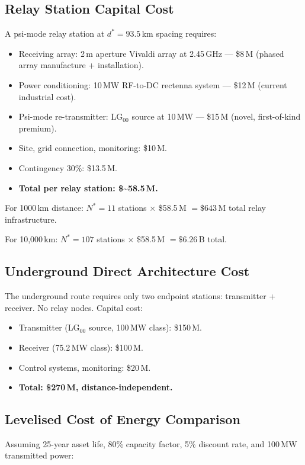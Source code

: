 \documentclass[aps,prd,twocolumn,superscriptaddress]{revtex4-2}
\begin{document}
\subsection{Relay Station Capital Cost}

A psi-mode relay station at $d^* = 93.5$\,km spacing requires:
\begin{itemize}
\item Receiving array: 2\,m aperture Vivaldi array at 2.45\,GHz ---
  \$8\,M (phased array manufacture + installation).
\item Power conditioning: 10\,MW RF-to-DC rectenna system ---
  \$12\,M (current industrial cost).
\item Psi-mode re-transmitter: LG$_{00}$ source at 10\,MW ---
  \$15\,M (novel, first-of-kind premium).
\item Site, grid connection, monitoring: \$10\,M.
\item Contingency 30\%: \$13.5\,M.
\item \textbf{Total per relay station: \$\sim58.5\,M.}
\end{itemize}

For 1000\,km distance: $N^* = 11$ stations $\times$ \$58.5\,M
$= \$643$\,M total relay infrastructure.

For 10,000\,km: $N^* = 107$ stations $\times$ \$58.5\,M
$= \$6.26$\,B total.

\subsection{Underground Direct Architecture Cost}

The underground route requires only two endpoint stations:
transmitter + receiver.  No relay nodes.  Capital cost:
\begin{itemize}
\item Transmitter (LG$_{00}$ source, 100\,MW class): \$150\,M.
\item Receiver (75.2\,MW class): \$100\,M.
\item Control systems, monitoring: \$20\,M.
\item \textbf{Total: \$270\,M, distance-independent.}
\end{itemize}

\subsection{Levelised Cost of Energy Comparison}

Assuming 25-year asset life, 80\% capacity factor, 5\% discount rate,
and 100\,MW transmitted power:
\end{document}
